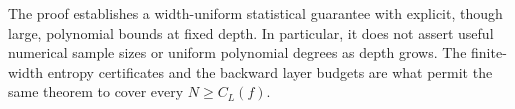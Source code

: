 \documentclass[11pt]{article}
\theoremstyle{remark}\newtheorem{remark}[theorem]{Remark}
\begin{document}
The proof establishes a width-uniform statistical guarantee with explicit,
though large, polynomial bounds at fixed depth. In particular, it does not
assert useful numerical sample sizes or uniform polynomial degrees as depth
grows. The finite-width entropy certificates and the backward layer budgets
are what permit the same theorem to cover every $N\geq C_L(f)$.
\end{document}
